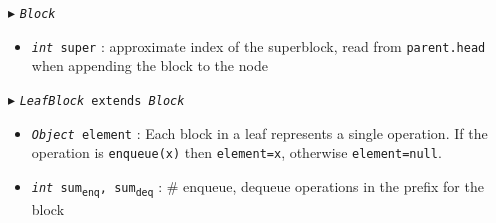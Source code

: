 \documentclass[10pt]{article}
\newcommand{\sub}[1]{\textsubscript{#1}}
\renewcommand{\tt}[1]{\texttt{#1}}
\renewcommand{\sl}[1]{\textsl{#1}}
\renewcommand{\it}[1]{\textit{#1}}
\newcommand{\cmt}[1]{\Comment{#1}}
\theoremstyle{definition}
\begin{document}
\begin{algorithm}
\begin{algorithmic}[1]
\begin{multicols}{2}
%  
%
%  

    

%  
%
%  

\Statex $\blacktriangleright$ \tt{\sl{Block}} 

\begin{itemize}

  \item \tt{\sl{int} super}
  \textsf{: approximate index of the superblock, read from \tt{parent.head} when appending the block to the node}
\end{itemize}




\Statex $\blacktriangleright$ \tt{\sl{LeafBlock} extends \sl{Block}}
\begin{itemize}
  \item \tt{\sl{Object} element}
  \textsf{: Each block in a leaf represents a single operation. If the operation is \tt{enqueue(x)} then \tt{element=x}, otherwise \tt{element=null}.}
  
    \item \tt{\sl{int} sum\sub{enq}, sum\sub{deq}}
  \textsf{: \# enqueue, dequeue operations in the prefix for the block}
  

\end{itemize}
\end{multicols}
\end{algorithmic}
\end{algorithm}
\end{document}
